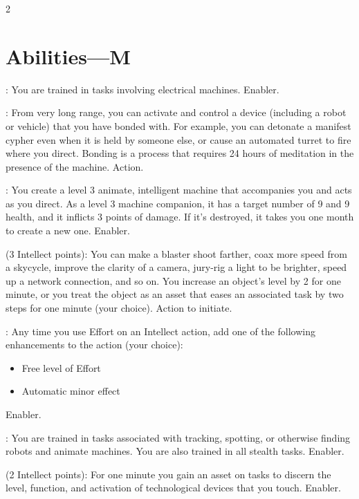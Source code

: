 \begin{multicols}{2}

\section{Abilities—M}

: You are trained in tasks involving electrical machines. Enabler. 
 
: From very long range, you can activate and control a device (including a robot or vehicle) that you have bonded with. For example, you can detonate a manifest cypher even when it is held by someone else, or cause an automated turret to fire where you direct. Bonding is a process that requires 24 hours of meditation in the presence of the machine. Action. 
 
: You create a level 3 animate, intelligent machine that accompanies you and acts as you direct. As a level 3 machine companion, it has a target number of 9 and 9 health, and it inflicts 3 points of damage. If it’s destroyed, it takes you one month to create a new one. Enabler. 
 
 (3 Intellect points): You can make a blaster shoot farther, coax more speed from a skycycle, improve the clarity of a camera, jury-rig a light to be brighter, speed up a network connection, and so on. You increase an object’s level by 2 for one minute, or you treat the object as an asset that eases an associated task by two steps for one minute (your choice). Action to initiate. 
 
: Any time you use Effort on an Intellect action, add one of the following enhancements to the action (your choice): 

\begin{itemize}
\item Free level of Effort 
\item Automatic minor effect 
\end{itemize}
Enabler.
 
: You are trained in tasks associated with tracking, spotting, or otherwise finding robots and animate machines. You are also trained in all stealth tasks. Enabler. 
 
 (2 Intellect points): For one minute you gain an asset on tasks to discern the level, function, and activation of technological devices that you touch. Enabler. 
 

\end{multicols}
